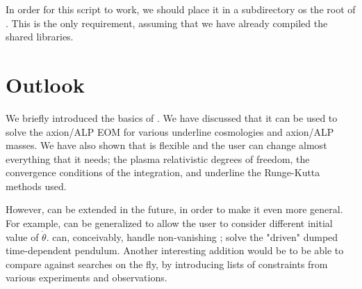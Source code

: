 \documentclass[a4paper,11pt]{article}
\begin{document}
	\lstset{language = python}
	
	
	In order for this script to work, we should place it in a subdirectory os the root of \mimes. This is the only requirement, assuming that we have already compiled the shared libraries. 



\section{Outlook}
%
We briefly introduced the basics of \mimes. We have discussed that it can be used to solve the axion/ALP EOM for various underline cosmologies and axion/ALP masses. We have also shown that \mimes is flexible and the user can change almost everything that it needs; \eg the plasma relativistic degrees of freedom, the convergence conditions of the integration, and underline the Runge-Kutta methods used.      

However, \mimes can be extended in the future, in order to make it even more general. For example, \mimes can be generalized to allow the user to consider different initial value of $\dot \theta$. \mimes can, conceivably, handle non-vanishing \rhs; \ie solve the "driven" dumped time-dependent pendulum. Another interesting addition would be to be able to compare against searches on the fly, by introducing lists of constraints from various experiments and observations.

%


{}
                        
\end{document}

